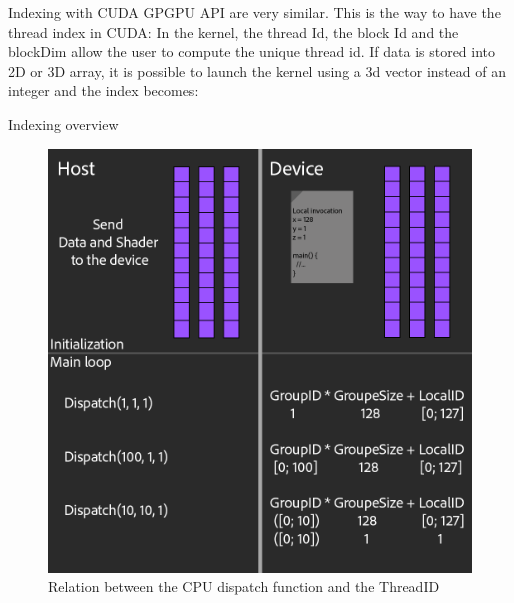 \documentclass{beamer}
\begin{document}
\begin{frame}{Indexing with CUDA}
	GPGPU API are very similar. This is the way to have the thread index in CUDA:
	In the kernel, the thread Id, the block Id and the blockDim allow the user to compute the unique thread id.
	\codeIndex
	If data is stored into 2D or 3D array, it is possible to launch the kernel using a 3d vector instead of an integer and the index becomes:
	\codeIndexDim
\end{frame}

\begin{frame}{Indexing overview}
	\begin{figure}
		\includegraphics[scale=0.2]{figures/threadID.png}
		\caption{Relation between the CPU dispatch function and the ThreadID}
	\end{figure}
\end{frame}
\end{document}
